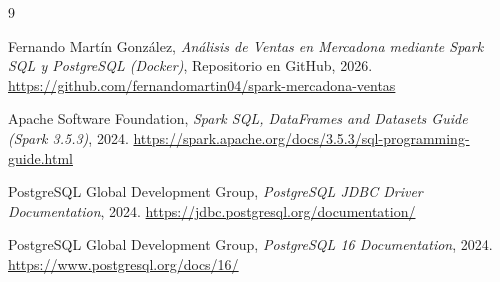 \documentclass[a4paper,12pt]{article}
\begin{document}
\begin{thebibliography}{9}

Fernando Martín González,
\textit{Análisis de Ventas en Mercadona mediante Spark SQL y PostgreSQL (Docker)},
Repositorio en GitHub, 2026.
\url{https://github.com/fernandomartin04/spark-mercadona-ventas}

Apache Software Foundation,
\textit{Spark SQL, DataFrames and Datasets Guide (Spark 3.5.3)},
2024.
\url{https://spark.apache.org/docs/3.5.3/sql-programming-guide.html}

PostgreSQL Global Development Group,
\textit{PostgreSQL JDBC Driver Documentation},
2024.
\url{https://jdbc.postgresql.org/documentation/}

PostgreSQL Global Development Group,
\textit{PostgreSQL 16 Documentation},
2024.
\url{https://www.postgresql.org/docs/16/}

\end{thebibliography}
\end{document}
